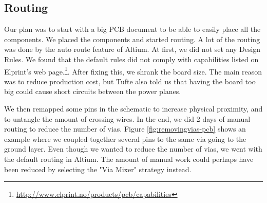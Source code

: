 \subsection {Routing}
\label{sec: pcb_routing}

Our plan was to start with a big PCB document to be able to easily place all the components. We placed the components and started routing. A lot of the routing was done by the auto route feature of Altium. At first, we did not set any Design Rules. We found that the default rules did not comply with capabilities listed on Elprint's web page.\footnote {\url{http://www.elprint.no/products/pcb/capabilities}}. After fixing this, we shrank the board size. The main reason was to reduce production cost, but Tufte also told us that having the board too big could cause short circuits between the power planes.

We then remapped some pins in the schematic to increase physical proximity, and to untangle the amount of crossing wires. In the end, we did 2 days of manual routing to reduce the number of vias. Figure \ref{fig:removingvias-pcb} shows an example where we coupled together several pins to the same via going to the ground layer. Even though we wanted to reduce the number of vias, we went with the default routing in Altium. The amount of manual work could perhaps have been reduced by selecting the "Via Mixer" strategy instead.



